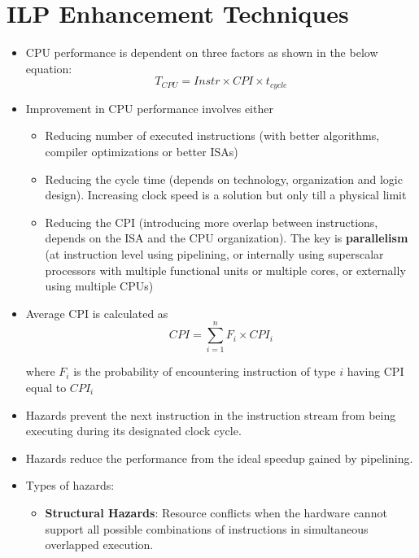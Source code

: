 \documentclass{article}
\begin{document}
\section{ILP Enhancement Techniques}
\begin{itemize}
    \item CPU performance is dependent on three factors as shown in the below equation:
    \begin{equation*}
        T_{CPU} = Instr \times CPI \times t_{cycle}
    \end{equation*}
    
    \item Improvement in CPU performance involves either
    \begin{itemize}
        \item Reducing number of executed instructions (with better algorithms, compiler optimizations or better ISAs)
    
        \item Reducing the cycle time (depends on technology, organization and logic design). Increasing clock speed is a solution but only till a physical limit
        
        \item Reducing the CPI (introducing more overlap between instructions, depends on the ISA and the CPU organization). The key is \textbf{parallelism} (at instruction level using pipelining, or internally using superscalar processors with multiple functional units or multiple cores, or externally using multiple CPUs)
    \end{itemize} 
    
    \item Average CPI is calculated as
    \begin{equation*}
        CPI = \sum_{i=1}^{n} F_i \times CPI_i
    \end{equation*}
    
    where $F_i$ is the probability of encountering instruction of type $i$ having CPI equal to $CPI_i$
    
    \item Hazards prevent the next instruction in the instruction stream from being executing during its designated clock cycle.
    
    \item Hazards reduce the performance from the ideal speedup gained by pipelining.
    
    \item Types of hazards:
    \begin{itemize}
        \item \textbf{Structural Hazards}: Resource conflicts when the hardware cannot support all possible combinations of instructions in simultaneous overlapped execution.
        

\end{itemize}
\end{itemize}
\end{document}
